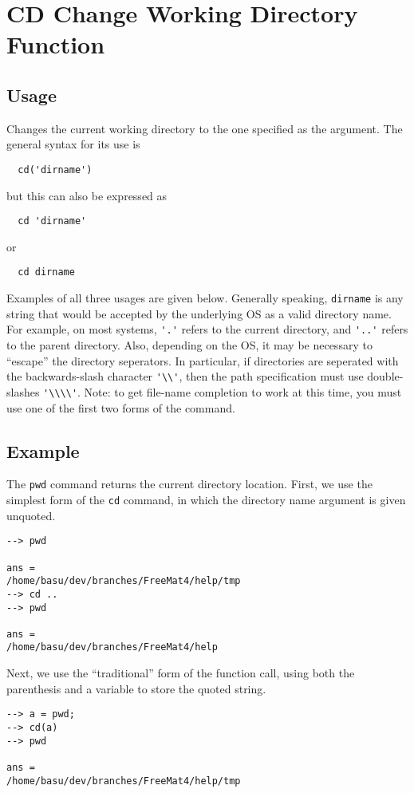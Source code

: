 \section{CD Change Working Directory Function}

\subsection{Usage}

Changes the current working directory to the one specified as the argument.  The general syntax for its use is
\begin{verbatim}
  cd('dirname')
\end{verbatim}
but this can also be expressed as
\begin{verbatim}
  cd 'dirname'
\end{verbatim}
or 
\begin{verbatim}
  cd dirname
\end{verbatim}
Examples of all three usages are given below.
Generally speaking, \verb|dirname| is any string that would be accepted 
by the underlying OS as a valid directory name.  For example, on most 
systems, \verb|'.'| refers to the current directory, and \verb|'..'| refers 
to the parent directory.  Also, depending on the OS, it may be necessary 
to ``escape'' the directory seperators.  In particular, if directories 
are seperated with the backwards-slash character \verb|'\\'|, then the 
path specification must use double-slashes \verb|'\\\\'|. Note: to get 
file-name completion to work at this time, you must use one of the 
first two forms of the command.

\subsection{Example}

The \verb|pwd| command returns the current directory location.  First, 
we use the simplest form of the \verb|cd| command, in which the directory 
name argument is given unquoted.
\begin{verbatim}
--> pwd

ans = 
/home/basu/dev/branches/FreeMat4/help/tmp
--> cd ..
--> pwd

ans = 
/home/basu/dev/branches/FreeMat4/help
\end{verbatim}
Next, we use the ``traditional'' form of the function call, using 
both the parenthesis and a variable to store the quoted string.
\begin{verbatim}
--> a = pwd;
--> cd(a)
--> pwd

ans = 
/home/basu/dev/branches/FreeMat4/help/tmp
\end{verbatim}
